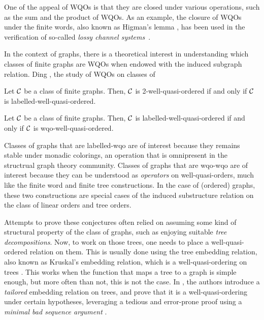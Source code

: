 One of the appeal of WQOs is that they are closed under various operations,
such as the sum and the product of WQOs. As an example, the closure of WQOs
under the finite words, also known as Higman's lemma \cite{HIG52}, has been
used in the verification of so-called \emph{lossy channel
systems}~\cite{ABDU93}. 

In the context of graphs, there is a theoretical interest in understanding
which classes of finite graphs are WQOs when endowed with the induced subgraph
relation. Ding \cite{DING95}, the study of WQOs on classes of


\begin{conjecture}
    \label{pouzet1:conj}
    Let $\mathcal{C}$ be a class of finite graphs.
    Then, $\mathcal{C}$ is 2-well-quasi-ordered
    if and only if
    $\mathcal{C}$ is labelled-well-quasi-ordered.
\end{conjecture}

\begin{conjecture}
    \label{pouzet2:conj}
    Let $\mathcal{C}$ be a class of finite graphs.
    Then, $\mathcal{C}$ is labelled-well-quasi-ordered
    if and only if
    $\mathcal{C}$ is wqo-well-quasi-ordered.
\end{conjecture}

Classes of graphs that are labelled-wqo are of interest because they remains
stable under monadic colorings, an operation that is omnipresent in the
structrual graph theory community. Classes of graphs that are wqo-wqo are of
interest because they can be understood as \emph{operators} on
well-quasi-orders, much like the finite word and finite tree constructions. In
the case of (ordered) graphs, these two constructions are special cases of the
induced substructure relation on the class of linear orders and tree orders.

Attempts to prove these conjectures often relied on assuming some kind of
structural property of the class of graphs, such as enjoying suitable
\emph{tree decompositions}. Now, to work on those trees, one needs to place a
well-quasi-ordered relation on them. This is usually done using the tree
embedding relation, also known as Kruskal's embedding relation, which is a
well-quasi-ordering on trees \cite{KRU72}. This works when the function that
maps a tree to a graph is simple enough, but more often than not, this is not
the case. In \cite{DRT10}, the authors introduce a \emph{tailored} embedding
relation on trees, and prove that it is a well-quasi-ordering under certain
hypotheses, leveraging a tedious and error-prone proof using a \emph{minimal
bad sequence argument} \cite{NASH65}.

